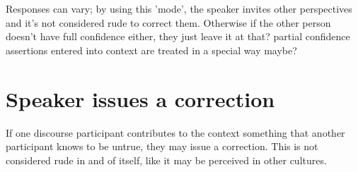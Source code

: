 \documentclass[smallroyalvopaper,9pt]{memoir}
\begin{document}
Responses can vary; by using this 'mode', the speaker invites other perspectives and it's not considered rude to correct them. Otherwise if the other person doesn't have full confidence either, they just leave it at that? partial confidence assertions entered into context are treated in a special way maybe?

\section{Speaker issues a correction}

If one discourse participant contributes to the context something that another participant knows to be untrue, they may issue a correction. This is not considered rude in and of itself, like it may be perceived in other cultures. 


\end{document}
